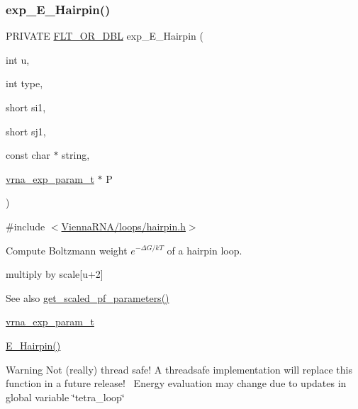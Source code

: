 \subsubsection{\texorpdfstring{exp\_E\_Hairpin()}{exp\_E\_Hairpin()}}
{\footnotesize\ttfamily P\+R\+I\+V\+A\+TE \mbox{\hyperlink{group__data__structures_ga31125aeace516926bf7f251f759b6126}{F\+L\+T\+\_\+\+O\+R\+\_\+\+D\+BL}} exp\+\_\+\+E\+\_\+\+Hairpin (\begin{DoxyParamCaption}\item[{int}]{u,  }\item[{int}]{type,  }\item[{short}]{si1,  }\item[{short}]{sj1,  }\item[{const char $\ast$}]{string,  }\item[{\mbox{\hyperlink{group__energy__parameters_ga01d8b92fe734df8d79a6169482c7d8d8}{vrna\+\_\+exp\+\_\+param\+\_\+t}} $\ast$}]{P }\end{DoxyParamCaption})}



{\ttfamily \#include $<$\mbox{\hyperlink{hairpin_8h}{Vienna\+R\+N\+A/loops/hairpin.\+h}}$>$}



Compute Boltzmann weight $e^{-\Delta G/kT} $ of a hairpin loop. 

multiply by scale\mbox{[}u+2\mbox{]} \begin{DoxySeeAlso}{See also}
\mbox{\hyperlink{group__energy__parameters_gabf3b9271c41dd3fac02d56e0b02b3344}{get\+\_\+scaled\+\_\+pf\+\_\+parameters()}} 

\mbox{\hyperlink{group__energy__parameters_ga01d8b92fe734df8d79a6169482c7d8d8}{vrna\+\_\+exp\+\_\+param\+\_\+t}} 

\mbox{\hyperlink{group__eval__loops__hp_gadf943ee9a45b7f4cee9192c06210dace}{E\+\_\+\+Hairpin()}} 
\end{DoxySeeAlso}
\begin{DoxyWarning}{Warning}
Not (really) thread safe! A threadsafe implementation will replace this function in a future release!~\newline
Energy evaluation may change due to updates in global variable \char`\"{}tetra\+\_\+loop\char`\"{}
\end{DoxyWarning}

